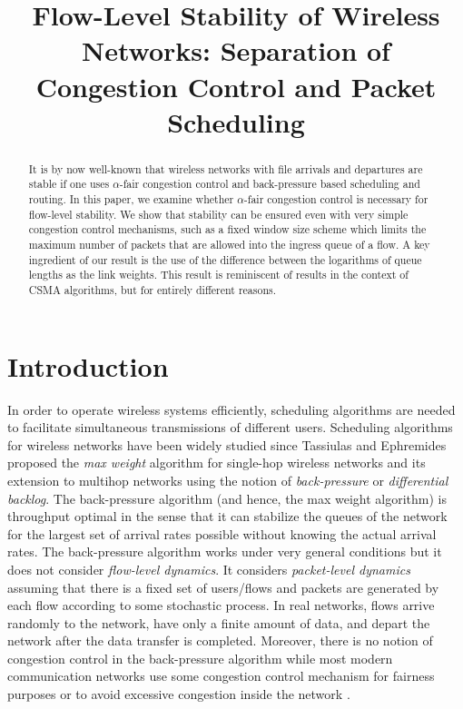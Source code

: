 \documentclass[10pt,onecolumn,draftclsnofoot,journal]{IEEEtran}
\begin{document}
\title{Flow-Level Stability of Wireless Networks: Separation of Congestion Control and Packet Scheduling}
\author{
}

\maketitle
\begin{abstract}
It is by now well-known that wireless networks with file arrivals and departures are stable if one uses $\alpha$-fair congestion control and back-pressure based scheduling and routing. In this paper, we examine whether $\alpha$-fair congestion control is necessary for flow-level stability. We show that stability can be ensured even with very simple congestion control mechanisms, such as a fixed window size scheme which limits the maximum number of packets that are allowed into the ingress queue of a flow. A key ingredient of our result is the use of the difference between the logarithms of queue lengths as the link weights. This result is reminiscent of results in the context of CSMA algorithms, but for entirely different reasons.
\end{abstract}

\section{Introduction}\label{sec:intro}
In order to operate wireless systems efficiently, scheduling algorithms are needed to facilitate simultaneous transmissions of different users.
Scheduling algorithms for wireless networks have been widely studied since Tassiulas and Ephremides \cite{eph}
proposed the \textit{max weight} algorithm for single-hop wireless networks and its extension to multihop networks using the notion of \textit{back-pressure} or \textit{differential backlog}. The back-pressure algorithm (and hence, the max weight algorithm)
is throughput optimal in the sense that it can stabilize
the queues of the network for the largest set of arrival rates possible without knowing the actual arrival rates. The back-pressure algorithm works under very general
conditions but it does not consider \textit{flow-level dynamics}. It considers \textit{packet-level dynamics} assuming that there is a fixed set of
users/flows and packets are generated by each flow according to some stochastic process. In real networks, flows arrive randomly to the network, have only a finite amount of data, and
depart the network after the data transfer is completed.
Moreover, there is no notion of congestion control in the back-pressure algorithm while most modern
communication networks use some congestion control mechanism for fairness purposes or to avoid excessive congestion inside the network \cite{LNS08}.
\end{document}
